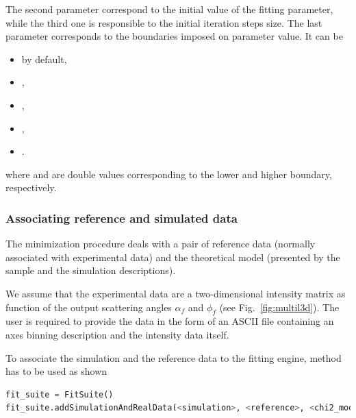 The second parameter  correspond to the initial value of
the fitting parameter, while the third one
is responsible to the initial iteration steps size.
The last parameter  corresponds to
the boundaries imposed on parameter value. It can be
\begin{itemize}
\item {} by default, 
\item {}, 
\item {}, 
\item {}, 
\item {}.
\end{itemize}
where  and  are
double values corresponding to the lower and higher boundary, respectively.


\subsubsection{Associating reference and simulated data}

The minimization procedure deals with a pair of reference data (normally
associated with experimental data) and the theoretical model (presented by the sample and the simulation descriptions).

We assume that the experimental data are a two-dimensional intensity 
matrix as function of the output scattering
angles $\alpha_f$ and $\phi_f$ (see Fig.~\ref{fig:multil3d}).
The user is required to provide the data in the form of an ASCII file
containing an axes
binning description and the intensity data itself. 
\vspace*{2mm}

\vspace*{1mm}

To associate the simulation and the reference data to the fitting engine, method \newline
{} has to be used as shown
\begin{lstlisting}[language=python, style=eclipseboxed,numbers=none]
fit_suite = FitSuite()
fit_suite.addSimulationAndRealData(<simulation>, <reference>, <chi2_module>)
\end{lstlisting}

